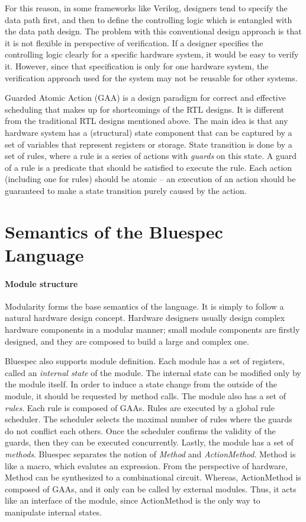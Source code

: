 For this reason, in some frameworks like Verilog, designers tend to
specify the data path first, and then to define the controlling logic
which is entangled with the data path design. The problem with this
conventional design approach is that it is not flexible in perspective
of verification. If a designer specifies the controlling logic clearly
for a specific hardware system, it would be easy to verify
it. However, since that specification is only for one hardware system,
the verification approach used for the system may not be reusable for
other systems.

Guarded Atomic Action (GAA) is a design paradigm for correct and
effective scheduling that makes up for shortcomings of the RTL
designs. It is different from the traditional RTL designs mentioned
above. The main idea is that any hardware system has a (structural)
state component that can be captured by a set of variables that
represent registers or storage. State transition is done by a set of
rules, where a rule is a series of actions with \emph{guards} on this
state. A guard of a rule is a predicate that should be satisfied to
execute the rule. Each action (including one for rules) should be
atomic -- an execution of an action should be guaranteed to make a
state transition purely caused by the action.

\section{Semantics of the Bluespec Language}
\label{sec:bluespec-semantics}

\paragraph{Module structure}

Modularity forms the base semantics of the \Bluespec{} language. It is
simply to follow a natural hardware design concept. Hardware designers
usually design complex hardware components in a modular manner; small
module components are firstly designed, and they are composed to build
a large and complex one.

Bluespec also supports module definition. Each module has a set of
registers, called an \emph{internal state} of the module. The internal
state can be modified only by the module itself. In order to induce a
state change from the outside of the module, it should be requested by
method calls. The module also has a set of \emph{rules}. Each rule is
composed of GAAs. Rules are executed by a global rule scheduler. The
scheduler selects the maximal number of rules where the guards do not
conflict each others. Once the scheduler confirms the validity of the
guards, then they can be executed concurrently. Lastly, the module has
a set of \emph{methods}. Bluespec separates the notion of
\emph{Method} and \emph{ActionMethod}. Method is like a macro, which
evalutes an expression. From the perspective of hardware, Method can
be synthesized to a combinational circuit.  Whereas, ActionMethod is
composed of GAAs, and it only can be called by external modules. Thus,
it acts like an interface of the module, since ActionMethod is the
only way to manipulate internal states.

